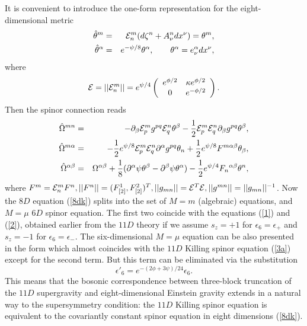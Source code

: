 \documentclass[a4paper,12pt]{article}
\begin{document}
It is convenient to introduce the one-form representation for the
eight-dimensional metric
\begin{eqnarray}
\hat \theta^m &=& {\cal E}^m_n (d \zeta^n + A^n_\nu dx^\nu) =
\theta^m, \nonumber\\
\hat \theta^\alpha &=& e^{-\psi/8} \theta^\alpha, \qquad
\theta^\alpha = e^\alpha_\nu dx^\nu,
\end{eqnarray}
where
\begin{equation}
{\cal E} = ||{\cal E}^m_n|| = e^{\psi/4} \left(\begin{array}{cc}
  e^{\phi/2} & \kappa e^{\phi/2} \\
  0 & e^{-\phi/2} \end{array} \right).
\end{equation}
Then the spinor connection reads
\begin{eqnarray}
\hat \Omega^{mn} &=& -\partial_\beta {\cal E}^m_p g^{pq} {\cal
E}^n_q \theta^\beta - \frac12 {\cal E}^m_p {\cal E}^n_q
\partial_\beta g^{pq} \theta^\beta, \nonumber\\
\hat \Omega^{m\alpha} &=& -\frac12 e^{\psi/8} {\cal E}^m_p {\cal
E}^n_q \partial^\alpha g^{pq} \theta_n + \frac12
e^{\psi/8} F^{m\alpha\beta} \theta_\beta, \label{con}\\
\hat \Omega^{\alpha\beta} &=& \Omega^{\alpha\beta} +
\frac18(\partial^\alpha \psi \theta^\beta -
\partial^\beta \psi \theta^\alpha) - \frac12
e^{\psi/4} F_n{}^{\alpha\beta} \theta^n, \nonumber
\end{eqnarray}
where $F^m = {\cal E}^m_n F^n, ||F^n||=(F^1_{[2]},F^2_{[2]})^T,
||g_{mn}||={\cal E}^T{\cal E}, ||g^{mn}||=||g_{mn}||^{-1}$. Now
the $8D$ equation (\ref{8dk}) splits into the set of $M=m$
(algebraic) equations, and $M=\mu$ $6D$ spinor equation. The
first two coincide with the equations (\ref{1}) and (\ref{2}),
obtained earlier from the $11D$ theory if we assume $s_z=+1$ for
$\epsilon_6=\epsilon_+$ and $s_z=-1$ for $\epsilon_6=\epsilon_-$.
The six-dimensional $M=\mu$ equation can be also presented in the
form which almost coincides with the $11D$ Killing spinor
equation (\ref{3a}) except for the second term. But this term can
be eliminated via the substitution
\begin{equation}
\epsilon'_6 = e^{-(2\phi+3\psi)/24} \epsilon_6.
\end{equation}
This means that the bosonic correspondence between three-block
truncation of the $11D$ supergravity and eight-dimensional
Einstein gravity extends in a natural way to the supersymmetry
condition: the $11D$ Killing spinor equation is equivalent to
the covariantly constant spinor equation in eight dimensions
(\ref{8dk}).
\end{document}
